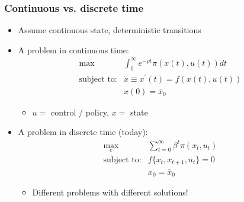 \documentclass[bigger,handout]{beamer}
\begin{document}
\begin{frame}%

\frametitle{Continuous vs. discrete time}

\begin{itemize}
\item Assume continuous state, deterministic transitions

\item A problem in continuous time:%
\begin{equation*}
\begin{array}{rc}
\max  & \int_{0}^{\infty }e^{-\rho t}\pi (x\left( t\right) ,u\left( t\right)
)dt \\
\text{subject to:} & \dot{x}\equiv x^{\prime }(t)=f(x(t),u(t)) \\
& x(0)=\bar{x}_{0}%
\end{array}%
\end{equation*}

\begin{itemize}
\item $u=$ control / policy, $x=$ state
\end{itemize}

\item A problem in discrete time (today):%
\begin{equation*}
\begin{array}{rc}
\max_{c} & \sum_{t=0}^{\infty }\beta ^{t}\pi (x_{t},u_{t}) \\
\text{subject to:} & f\{x_{t},x_{t+1},u_{t}\}=0 \\
& x_{0}=\bar{x}_{0}%
\end{array}%
\end{equation*}

\begin{itemize}
\item Different problems with different solutions!
\end{itemize}
\end{itemize}



\end{frame}%
\end{document}
